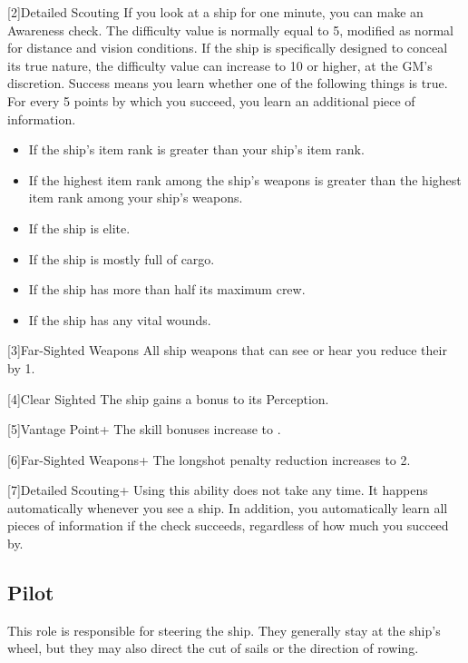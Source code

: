         [2]{Detailed Scouting} If you look at a ship for one minute, you can make an Awareness check.
        The difficulty value is normally equal to 5, modified as normal for distance and vision conditions.
        If the ship is specifically designed to conceal its true nature, the difficulty value can increase to 10 or higher, at the GM's discretion.
        Success means you learn whether one of the following things is true.
        For every 5 points by which you succeed, you learn an additional piece of information.
        \begin{itemize}
            \item If the ship's item rank is greater than your ship's item rank.
            \item If the highest item rank among the ship's weapons is greater than the highest item rank among your ship's weapons.
            \item If the ship is elite.
            \item If the ship is mostly full of cargo.
            \item If the ship has more than half its maximum crew.
            \item If the ship has any vital wounds.
        \end{itemize}

        [3]{Far-Sighted Weapons} All ship weapons that can see or hear you reduce their  by 1.

        [4]{Clear Sighted} The ship gains a  bonus to its Perception.

        [5]{Vantage Point+} The skill bonuses increase to .

        [6]{Far-Sighted Weapons+} The longshot penalty reduction increases to 2.

        [7]{Detailed Scouting+} Using this ability does not take any time.
        It happens automatically whenever you see a ship.
        In addition, you automatically learn all pieces of information if the check succeeds, regardless of how much you succeed by.

    \subsection{Pilot}
        This role is responsible for steering the ship.
        They generally stay at the ship's wheel, but they may also direct the cut of sails or the direction of rowing.

